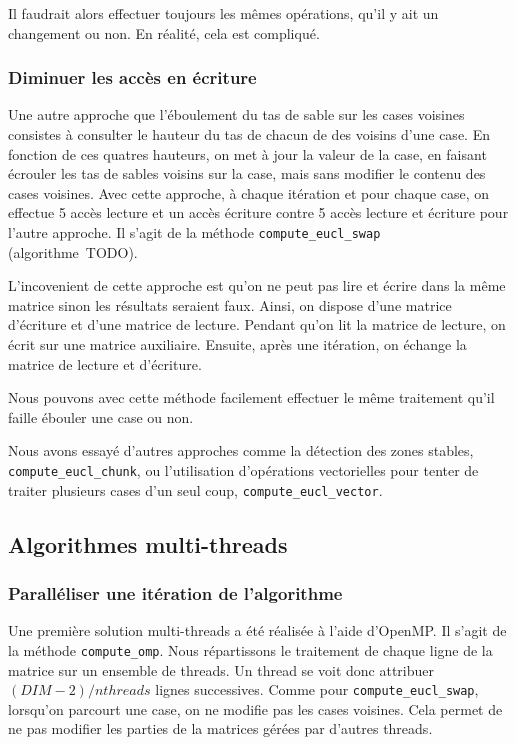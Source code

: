 Il faudrait alors effectuer toujours les mêmes opérations, qu'il y ait
un changement ou non. En réalité, cela est compliqué.
\medskip

\subsubsection{Diminuer les accès en écriture}

Une autre approche que l'éboulement du tas de sable sur les cases
voisines consistes à consulter le hauteur du tas de chacun de des
voisins d'une case. En fonction de ces quatres hauteurs, on met à jour
la valeur de la case, en faisant écrouler les tas de sables voisins
sur la case, mais sans modifier le contenu des cases voisines. Avec
cette approche, à chaque itération et pour chaque case, on effectue 5
accès lecture et un accès écriture contre 5 accès lecture et écriture
pour l'autre approche. Il s'agit de la méthode
\texttt{compute\_eucl\_swap} (algorithme~TODO).

L'incovenient de cette approche est qu'on ne peut pas lire et écrire
dans la même matrice sinon les résultats seraient faux. Ainsi, on
dispose d'une matrice d'écriture et d'une matrice de lecture. Pendant
qu'on lit la matrice de lecture, on écrit sur une matrice
auxiliaire. Ensuite, après une itération, on échange la matrice de
lecture et d'écriture.

Nous pouvons avec cette méthode facilement effectuer le même
traitement qu'il faille ébouler une case ou non.
\bigskip

Nous avons essayé d'autres approches comme la détection des zones
stables, \texttt{compute\_eucl\_chunk}, ou l'utilisation d'opérations vectorielles pour tenter de
traiter plusieurs cases d'un seul coup, \texttt{compute\_eucl\_vector}.

\subsection{Algorithmes multi-threads}

\subsubsection{Paralléliser une itération de l'algorithme}

Une première solution multi-threads a été réalisée à l'aide
d'OpenMP. Il s'agit de la méthode \texttt{compute\_omp}.  Nous
répartissons le traitement de chaque ligne de la matrice sur un
ensemble de threads. Un thread se voit donc attribuer
$(DIM-2)/nthreads$ lignes successives. Comme pour
\texttt{compute\_eucl\_swap}, lorsqu'on parcourt une case, on ne
modifie pas les cases voisines. Cela permet de ne pas modifier les
parties de la matrices gérées par d'autres threads.

